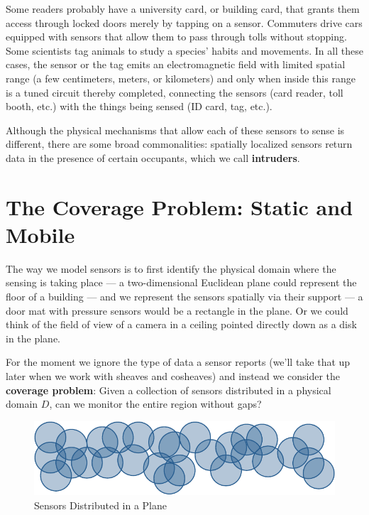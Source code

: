 \begin{ex}
	Some readers probably have a university card, or building card, that grants them access through locked doors merely by tapping on a sensor. Commuters drive cars equipped with sensors that allow them to pass through tolls without stopping. Some scientists tag animals to study a species' habits and movements. In all these cases, the sensor or the tag emits an electromagnetic field with limited spatial range (a few centimeters, meters, or kilometers) and only when inside this range is a tuned circuit thereby completed, connecting the sensors (card reader, toll booth, etc.) with the things being sensed (ID card, tag, etc.).
\end{ex}

Although the physical mechanisms that allow each of these sensors to sense is different, there are some broad commonalities: spatially localized sensors return data in the presence of certain occupants, which we call \textbf{intruders}. 

\section{The Coverage Problem: Static and Mobile}
\label{subsec:coverage}

The way we model sensors is to first identify the physical domain where the sensing is taking place --- a two-dimensional Euclidean plane could represent the floor of a building --- and we represent the sensors spatially via their support --- a door mat with pressure sensors would be a rectangle in the plane. Or we could think of the field of view of a camera in a ceiling pointed directly down as a disk in the plane. 

For the moment we ignore the type of data a sensor reports (we'll take that up later when we work with sheaves and cosheaves) and instead we consider the \textbf{coverage problem}: Given a collection of sensors distributed in a physical domain $D$, can we monitor the entire region without gaps?

\begin{figure}
\centering
\includegraphics[width=\textwidth]{sensors.pdf}
\caption{Sensors Distributed in a Plane}
\label{fig:sensors5in}
\end{figure}

